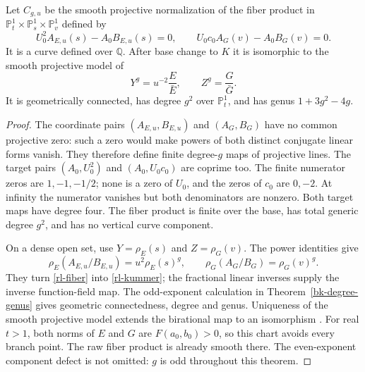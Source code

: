 \begin{theorem}\label{rl-rational-model}
Let $C_{g,u}$ be the smooth projective normalization of the fiber
product in $\mathbb P^1_t\times\mathbb P^1_s\times\mathbb P^1_v$
defined by
\begin{equation}\label{rl-fiber}
 U_0^2 A_{E,u}(s)-A_0B_{E,u}(s)=0,\qquad
 U_0c_0 A_G(v)-A_0B_G(v)=0.
\end{equation}
It is a curve defined over $\mathbb Q$. After base change to $K$
it is isomorphic to the smooth projective model of
\begin{equation}\label{rl-kummer}
 Y^g=u^{-2}\frac{E}{\bar E},\qquad
 Z^g=\frac{G}{\bar G}.
\end{equation}
It is geometrically connected, has degree $g^2$ over
$\mathbb P^1_t$, and has genus $1+3g^2-4g$.
\end{theorem}
\begin{proof}
The coordinate pairs $(A_{E,u},B_{E,u})$ and $(A_G,B_G)$ have no
common projective zero: such a zero would make powers of both
distinct conjugate linear forms vanish. They therefore define
finite degree-$g$ maps of projective lines.
The target pairs $(A_0,U_0^2)$ and $(A_0,U_0c_0)$ are coprime too.
The finite numerator zeros are $1,-1,-1/2$; none is a zero of
$U_0$, and the zeros of $c_0$ are $0,-2$. At infinity the
numerator vanishes but both denominators are nonzero. Both target
maps have degree four. The fiber product is finite over the base,
has total generic degree $g^2$, and has no vertical curve component.

On a dense open set, use $Y=\rho_E(s)$ and $Z=\rho_G(v)$.
The power identities give
\[
 \rho_E(A_{E,u}/B_{E,u})=u^2\rho_E(s)^g,\qquad
 \rho_G(A_G/B_G)=\rho_G(v)^g.
\]
They turn \eqref{rl-fiber} into \eqref{rl-kummer}; the fractional
linear inverses supply the inverse function-field map.
The odd-exponent calculation in Theorem~\ref{bk-degree-genus}
gives geometric connectedness, degree and genus. Uniqueness of
the smooth projective model extends the birational map to an
isomorphism \cite{StacksCurves2026}.
For real $t>1$, both norms of $E$ and $G$ are
$F(a_0,b_0)>0$, so this chart avoids every branch point.
The raw fiber product is already smooth there.
The even-exponent component defect is not omitted: $g$ is odd
throughout this theorem.
\end{proof}

